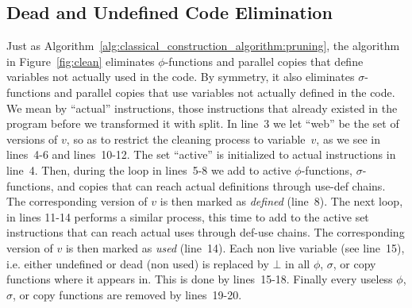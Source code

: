 \subsection{Dead and Undefined Code Elimination}

Just as Algorithm~\ref{alg:classical_construction_algorithm:pruning}, the algorithm in Figure~\ref{fig:clean} eliminates $\phi$-functions and parallel copies that define variables not actually used in the code. By symmetry, it also eliminates $\sigma$-functions  and parallel copies  that use variables not actually defined in the code.
We mean by ``actual'' instructions, those instructions that already existed in the program before we transformed it with {\sf split}.
In line~3 we let ``web'' be the set of versions of $v$, so as to restrict the cleaning process to variable~$v$, as we see in lines~4-6 and lines~10-12.
The set ``active'' is initialized to actual instructions in line~4.
Then, during the loop in lines~5-8 we add to active $\phi$-functions, $\sigma$-functions, and copies that can reach actual definitions through use-def chains.
The corresponding version of $v$ is then marked as \emph{defined} (line~8).
The next loop, in lines 11-14 performs a similar process, this time to add to the active set instructions that can reach actual uses through def-use chains.
The corresponding version of $v$ is then marked as \emph{used} (line~14).
Each non live variable (see line~15), i.e. either undefined or dead (non used) is replaced by $\bot$ in all $\phi$, $\sigma$, or copy functions where it appears in.
This is done by lines~15-18.
Finally every useless $\phi$, $\sigma$, or copy functions are removed by lines~19-20. 

